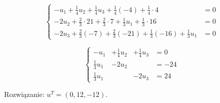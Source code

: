 \begin{frame}
    $$ \left\{ \begin{array}{ll}
    -u_1 + \frac{1}{4} u_2 + \frac{1}{4} u_3 + \frac{1}{4} (-4) + \frac{1}{4} \cdot 4 & =0 \\
    -2 u_2 + \frac{2}{3} \cdot 21 + \frac{2}{3} \cdot 7 + \frac{1}{3} u_1 + \frac{1}{3} \cdot 16 & =0 \\
    -2 u_3 + \frac{2}{3} (-7) + \frac{2}{3} (-21) + \frac{1}{3} (-16) + \frac{1}{3} u_1 & =0
    \end{array} \right. $$

  $$ \left\{ \begin{array}{llll}
  - u_1 & + \frac{1}{4} u_2 & +\frac{1}{4} u_3 & =0 \\
  \frac{1}{3} u_1 & -2 u_2 && =-24 \\
  \frac{1}{3} u_1 && -2 u_3 & =24
  \end{array} \right. $$

  Rozwiązanie: $u^T = (0, 12, -12)$.
\end{frame}

